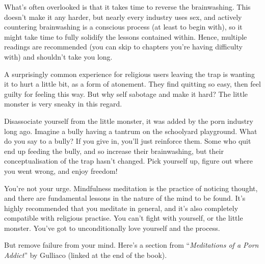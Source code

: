 \documentclass[
]{book}
\begin{document}
What's often overlooked is that it takes time to reverse the brainwashing. This doesn't make it any harder, but nearly every industry uses sex, and actively countering brainwashing is a conscious process (at least to begin with), so it might take time to fully solidify the lessons contained within. Hence, multiple readings are recommended (you can skip to chapters you're having difficulty with) and shouldn't take you long.

A surprisingly common experience for religious users leaving the trap is wanting it to hurt a little bit, as a form of atonement. They find quitting so easy, then feel guilty for feeling this way. But why self sabotage and make it hard? The little monster is very sneaky in this regard.

Disassociate yourself from the little monster, it was added by the porn industry long ago. Imagine a bully having a tantrum on the schoolyard playground. What do you say to a bully? If you give in, you'll just reinforce them. Some who quit end up feeding the bully, and so increase their brainwashing, but their conceptualisation of the trap hasn't changed. Pick yourself up, figure out where you went wrong, and enjoy freedom!

You're not your urge. Mindfulness meditation is the practice of noticing thought, and there are fundamental lessons in the nature of the mind to be found. It's highly recommended that you meditate in general, and it's also completely compatible with religious practise. You can't fight with yourself, or the little monster. You've got to unconditionally love yourself and the process.

But remove failure from your mind. Here's a section from ``\emph{Meditations of a Porn Addict}'' by Gulliaco (linked at the end of the book).
\end{document}
